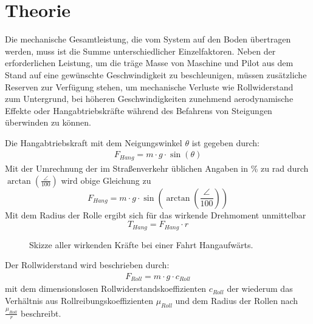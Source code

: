 \chapter{Theorie}
	Die mechanische Gesamtleistung, die vom System auf den Boden übertragen werden, muss ist die Summe unterschiedlicher Einzelfaktoren.
	Neben der erforderlichen Leistung, um die träge Masse von Maschine und Pilot aus dem Stand auf eine gewünschte Geschwindigkeit zu beschleunigen, müssen zusätzliche Reserven zur Verfügung stehen, um mechanische Verluste wie Rollwiderstand zum Untergrund, bei höheren Geschwindigkeiten zunehmend aerodynamische Effekte oder Hangabtriebskräfte während des Befahrens von Steigungen überwinden zu können.\par\medskip
	Die Hangabtriebskraft mit dem Neigungswinkel \(\theta\) ist gegeben durch:
	\begin{align}
		F_{Hang} = m \cdot g \cdot \sin\left(\theta\right)
		\label{eq:downhill force}
	\end{align}
	Mit der Umrechnung der im Straßenverkehr üblichen Angaben in \unit{\percent} zu \unit{\radian} durch \(\arctan\left(\frac{\angle}{100}\right)\) wird obige Gleichung zu
	\begin{equation}
		F_{Hang} = m \cdot g \cdot \sin\left(\arctan\left(\frac{\angle}{100}\right)\right)
		\label{eq:downhill force incline to radian}
	\end{equation}
	Mit dem Radius der Rolle ergibt sich für das wirkende Drehmoment unmittelbar
	\begin{equation}
		T_{Hang} = F_{Hang} \cdot r
		\label{eq:incline torque}
	\end{equation}
	\begin{figure}[h]
		\centering
		
		\caption[Skizze aller wirkenden Kräfte bei einer Fahrt Hangaufwärts]{Skizze aller wirkenden Kräfte bei einer Fahrt Hangaufwärts.}
		\label{fig:sketch torque incline}
	\end{figure}
	Der Rollwiderstand wird beschrieben durch:
	\begin{align}
		F_{Roll} = m \cdot g \cdot c_{Roll}
		\label{eq:rolling resistance}
	\end{align}
	mit dem dimensionslosen Rollwiderstandskoeffizienten \(c_{Roll}\) der wiederum das Verhältnis aus Rollreibungskoeffizienten \(\mu_{Roll}\) und dem Radius der Rollen nach \(\frac{\mu_{Roll}}{r}\) beschreibt.\par\medskip
	

